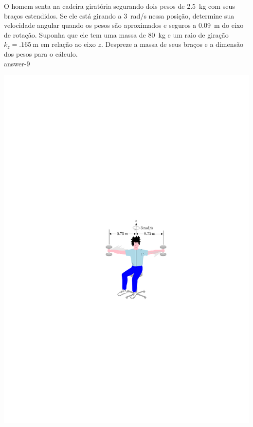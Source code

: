 \begin{minipage}{.6\linewidth}
	\vspace{-1cm}
	\item O homem senta na cadeira giratória segurando dois pesos de \SI{2.5}{\kilogram} com seus braços estendidos. Se ele está girando a \SI{3}{\radian/\second} nessa posição, determine sua velocidade angular quando os pesos são aproximados e seguros a \SI{.09}{\meter} do eixo de rotação. Suponha que ele tem uma massa de \SI{80}{\kilogram} e um raio de giração $k_{z}=\SI{.165}{\meter}$ em relação ao eixo $z$. Despreze a
	massa de seus braços e a dimensão dos pesos para o cálculo.\\
	
	{answer-9}
\end{minipage}
\begin{minipage}{.4\linewidth}
	\begin{flushright}
		\includegraphics[scale=1.2]{../../images/draw_6}
	\end{flushright}

\end{minipage}